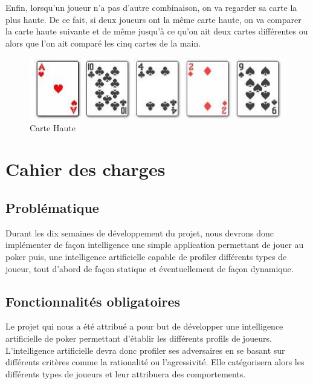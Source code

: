 \documentclass{report}
\begin{document}
Enfin, lorsqu'un joueur n'a pas d'autre combinaison, on va regarder sa carte la plus haute. De ce fait, si deux joueurs ont la même carte haute, on va comparer la carte haute suivante et de même jusqu'à ce qu'on ait deux cartes différentes ou alors que l'on ait comparé les cinq cartes de la main. \par
		\begin{figure}[h]
			\begin{center}
				\includegraphics[scale=0.4]{./imagesRapport/carteHaute.jpg}
			\end{center}
			\caption[Carte Haute]{Carte Haute}
		\end{figure}
		\medskip

\section{Cahier des charges}
\subsection{Problématique}
\hspace{0.5cm}Durant les dix semaines de développement du projet, nous devrons donc implémenter de façon intelligence une simple application permettant de jouer au poker puis, une intelligence artificielle capable de profiler différents types de joueur, tout d'abord de façon statique et éventuellement de façon dynamique.
\subsection{Fonctionnalités obligatoires}

\hspace{0.5cm}Le projet qui nous a été attribué a pour but de développer une intelligence artificielle de poker permettant d'établir les différents profils de joueurs.\\

L'intelligence artificielle devra donc profiler ses adversaires en se basant sur différents critères comme la rationalité ou l'agressivité. Elle catégorisera alors les différents types de joueurs et leur attribuera des comportements.\\
\end{document}
